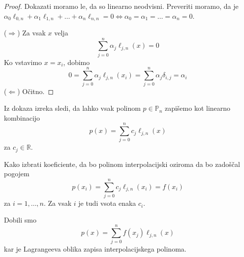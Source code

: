 \documentclass[a4paper,12pt]{article}
\theoremstyle{definition}
\theoremstyle{remark}
\newcommand{\R}{\mathbb{R}}
\newcommand{\Pp}{\mathbb{P}}
\begin{document}
\begin{proof}
    Dokazati moramo le, da so linearno neodvisni. Preveriti moramo, da je $\alpha_0 \ell_{0, n} +  \alpha_1 \ell_{1, n} + \dots +
    \alpha_n \ell_{n, n} = 0 \iff \alpha_0 = \alpha_1 = \dots = \alpha_n = 0$.

    ($\Longrightarrow$)
    Za vsak $x$ velja
    \begin{equation*}
        \sum_{j = 0}^{n} \alpha_j \ell_{j, n} (x) = 0
    \end{equation*}
    Ko vstavimo $x = x_i$, dobimo
    \begin{equation*}
        0 = \sum_{j = 0}^{n} \alpha_j \ell_{j, n} (x_i) = \sum_{j = 0}^{n} \alpha_j \delta_{i, j} = \alpha_i
    \end{equation*}
    ($\Longleftarrow$) Očitno.
\end{proof}

Iz dokaza izreka sledi, da lahko vsak polinom $p \in \Pp_n$ zapišemo kot linearno kombinacijo
\begin{equation*}
    p(x) = \sum_{j = 0}^{n} c_j \ell_{j, n} (x)
\end{equation*}
za $c_j \in \R$.

Kako izbrati koeficiente, da bo polinom interpolacijski oziroma da bo zadoščal pogojem
\begin{equation*}
    p(x_i) = \sum_{j = 0}^{n} c_j \ell_{j, n} (x_i) = f(x_i)
\end{equation*}
za $i = 1, \dots, n$. Za vsak $i$ je tudi vsota enaka $c_i$.

Dobili smo
\begin{equation*}
    p(x) = \sum_{j = 0}^{n} f(x_j) \ell_{j, n}(x)
\end{equation*}
kar je Lagrangeeva oblika zapisa interpolacijskega polinoma.
\end{document}
